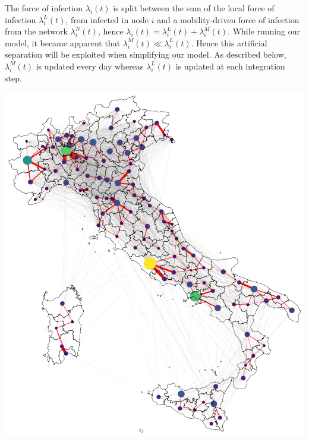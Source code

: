 The force of infection $\lambda_i(t)$ is split between the sum of the local force of infection $\lambda^L_i(t)$, from infected in node $i$ and a mobility-driven force of infection from the network $\lambda^N_i(t)$, hence $\lambda_i(t) = \lambda^L_i(t) + \lambda^M_i(t)$. While running our model, it became apparent that $\lambda^M_i(t) \ll \lambda^L_i(t)$. Hence this artificial separation will be exploited when simplifying our model. As described below, $\lambda^M_i(t)$ is updated every day whereas $\lambda^L_i(t)$ is updated at each integration step.
\begin{marginfigure}
\centering
\includegraphics{fig_italy-ocp/figures/map_nd.png}
    \label{fig:model_description_network}
\end{marginfigure}

